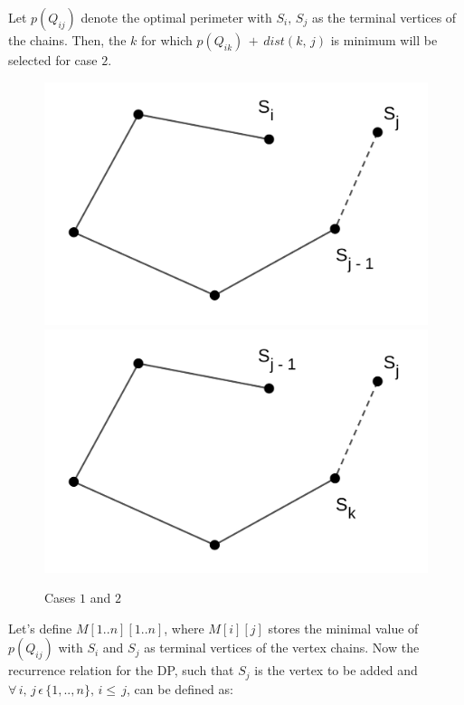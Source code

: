 \documentclass{article}
\begin{document}
    Let $p(Q_{ij})$ denote the optimal perimeter with $S_i,\,S_j$ as the terminal vertices
    of the chains. Then, the $k$ for which $p(Q_{ik})\,+\,dist(k,\,j)$ is minimum will be
    selected for case $2$.
    
    \begin{figure}[!h]
    \centering
        \includegraphics[scale=0.20]{1.png}
        \hspace{1cm}
        \includegraphics[scale=0.20]{2.png}
        \caption{Cases $1$ and $2$}
        \label{fig:poly1}
    \end{figure}

    Let's define $M[1..n][1..n]$, where $M[i][j]$ stores the minimal value of $p(Q_{ij})$ 
    with $S_i$ and $S_j$ as terminal vertices of the vertex chains. 
    Now the recurrence relation for the DP, such that $S_j$ is the vertex to be added and 
    $\forall\,i,\,j\,\epsilon\,\{1,..,n\},\,i\le\,j$, can be defined as:
    
\end{document}
